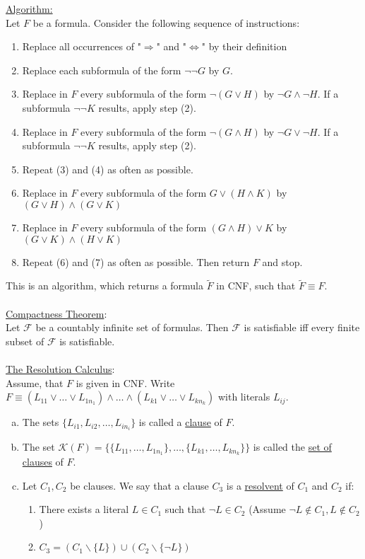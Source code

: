 \documentclass[a4paper]{article}
\newcommand{\ul}{\underline}
\begin{document}
\ul{Algorithm:}\\
Let $F$ be a formula. Consider the following sequence of instructions:
\begin{enumerate}[(1)]
	\item Replace all occurrences of "$\Rightarrow$" and "$\Leftrightarrow$" by their definition
	\item Replace each subformula of the form $\neg$$\neg G$ by $G$.
	\item Replace in $F$ every subformula of the form $\neg (G\vee H)$ by $\neg G\wedge \neg H$. If a subformula $\neg$$\neg K$ results, apply step (2).
	\item Replace in $F$ every subformula of the form $\neg (G\wedge H)$ by $\neg G\vee \neg H$. If a subformula $\neg$$\neg K$ results, apply step (2).
	\item Repeat (3) and (4) as often as possible.
	\item Replace in $F$ every subformula of the form $G\vee (H\wedge K)$ by $(G\vee H)\wedge (G\vee K)$
	\item Replace in $F$ every subformula of the form $(G\wedge H)\vee K$ by $(G\vee K)\wedge (H\vee K)$
	\item Repeat (6) and (7) as often as possible. Then return $F$ and stop.
\end{enumerate}
This is an algorithm, which returns a formula $\tilde{F}$ in CNF, such that $\tilde{F}\equiv F$.\\\\
\ul{Compactness Theorem}:\\
Let $\mathcal{F}$ be a countably infinite set of formulas. Then $\mathcal{F}$ is satisfiable iff every finite subset of $\mathcal{F}$ is satisfiable.\\\\
\ul{The Resolution Calculus}:\\
Assume, that $F$ is given in CNF. Write $F\equiv (L_{11}\vee\dots\vee L_{1n_1})\wedge\dots\wedge(L_{k1}\vee\dots\vee L_{kn_k})$ with literals $L_{ij}$.
\begin{enumerate}[(a)]
	\item The sets $\{L_{i1},L_{i2},\dots,L_{in_i}\}$ is called a \ul{clause} of $F$.
	\item The set $\mathcal{K}(F)=\{\{L_{11},\dots,L_{1n_1}\},\dots,\{L_{k1},\dots,L_{kn_k}\}\}$ is called the \ul{set of clauses} of $F$.
	\item Let $C_1,C_2$ be clauses. We say that a clause $C_3$ is a \ul{resolvent} of $C_1$ and $C_2$ if:
	\begin{enumerate}[(1)]
		\item There exists a literal $L\in C_1$ such that $\neg L\in C_2$ (Assume $\neg L\notin C_1,L\notin C_2$)
		\item $C_3=(C_1\backslash\{L\})\cup (C_2\backslash\{\neg L\})$
	\end{enumerate}
\end{enumerate}
\end{document}
